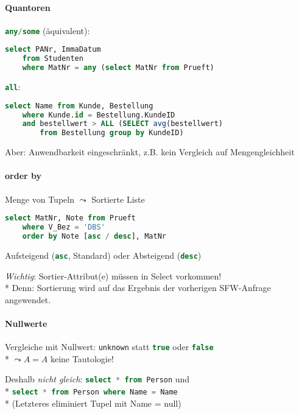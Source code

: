 \paragraph{Quantoren}
\begin{items}
	\item \lstinline[language=sql]{any/some} (äquivalent):
	\begin{lstlisting}[language=sql]
select PANr, ImmaDatum
	from Studenten
	where MatNr = any (select MatNr from Prueft)
	\end{lstlisting}
	\item \lstinline[language=sql]{all}:
	\begin{lstlisting}[language=sql]
select Name from Kunde, Bestellung
	where Kunde.id = Bestellung.KundeID
	and bestellwert > ALL (SELECT avg(bestellwert) 
		from Bestellung group by KundeID)
	\end{lstlisting}
	\item Aber: Anwendbarkeit eingeschränkt, z.B. kein Vergleich auf Mengengleichheit
\end{items}

\paragraph{order by}
\begin{items}
	\item Menge von Tupeln $\leadsto$ Sortierte Liste
	\begin{lstlisting}[language=sql]
select MatNr, Note from Prueft
	where V_Bez = 'DBS'
	order by Note [asc / desc], MatNr
	\end{lstlisting}
	\item Aufsteigend (\lstinline[language=sql]{asc}, Standard) oder Absteigend (\lstinline[language=sql]{desc})
	\item \emph{Wichtig}: Sortier-Attribut(e) müssen in Select vorkommen!\\*
	Denn: Sortierung wird auf das Ergebnis der vorherigen SFW-Anfrage angewendet.
\end{items}

\paragraph{Nullwerte}
\begin{items}
	\item Vergleiche mit Nullwert: \lstinline[language=sql]{unknown} statt \lstinline[language=sql]{true} oder \lstinline[language=sql]{false} \\*
	\( \leadsto A=A \) keine Tautologie!
	\item Deshalb \emph{nicht gleich}: \lstinline[language=sql]{select * from Person} und \\* \lstinline[language=sql]{select * from Person where Name = Name}\\*
	(Letzteres eliminiert Tupel mit Name = null)
\end{items}

